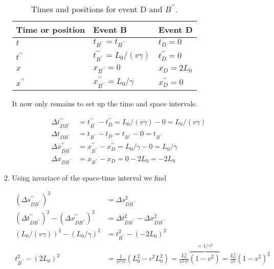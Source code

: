 \documentclass[a4paper,10pt,english]{article}
\begin{document}
\begin{enumerate}
\begin{enumerate}
\begin{table}[H]
  \begin{center}
    \begin{tabular}{| l | l | l |}
   	\hline
	 Time or position & Event B & Event D\\ \hline
	 $t$ & $t_{B^{\prime\prime}}=t_{B^{\prime\prime}}$ & $t_{D}=0$ \\ \hline
	 $t^{\prime\prime}$ & $t^{\prime\prime}_{B^{\prime\prime}}=L_{0}/(v\gamma)$ & $t_{D}^{\prime\prime}=0$\\ \hline
	 $x$ & $x_{B^{\prime\prime}}=0$ & $x_{D}=2L_{0}$\\ \hline
	 $x^{\prime\prime}$ & $x^{\prime\prime}_{B^{\prime\prime}}=L_{0}/\gamma$ & $x_{D}^{\prime\prime}=0$\\ \hline
	\end{tabular}
    \caption{Times and positions for event D and $B^{\prime\prime}$.}
    \label{tabel:ex_2A_8_2}
  \end{center}
\end{table}
\FloatBarrier

It now only remains to set up the time and space intervals.

\begin{align*}
\Delta t^{\prime\prime}_{DB^{\prime\prime}}&=t^{\prime\prime}_{B^{\prime\prime}}-t^{\prime\prime}_{D}=L_{0}/(v\gamma)-0=L_{0}/(v\gamma)\\
\Delta t_{DB^{\prime\prime}}&=t_{B^{\prime\prime}}-t_{D}=t_{B^{\prime\prime}}-0=t_{B^{\prime\prime}}\\
\Delta x^{\prime\prime}_{DB^{\prime\prime}}&=x^{\prime\prime}_{B^{\prime\prime}}-x^{\prime\prime}_{D}=L_{0}/\gamma-0=L_{0}/\gamma\\
\Delta x_{DB^{\prime\prime}}&=x_{B^{\prime\prime}}-x_{D}=0-2L_{0}=-2L_{0}
\end{align*}

\item Using invariace of the space-time interval we find

\begin{align*}
(\Delta s^{\prime\prime}_{DB^{\prime\prime}})^{2}&=\Delta s_{DB^{\prime\prime}}^{2}\\
(\Delta t^{\prime\prime}_{DB^{\prime\prime}})^{2}-(\Delta x^{\prime\prime}_{DB^{\prime\prime}})^{2}&=\Delta t_{DB^{\prime\prime}}^{2}-\Delta x_{DB^{\prime\prime}}^{2}\\
(L_{0}/(v\gamma))^{2}-(L_{0}/\gamma)^{2}&=t_{B^{\prime\prime}}^{2}-(-2L_{0})^{2}\\
t_{B^{\prime\prime}}^{2}-(2L_{0})^{2}&=\frac{1}{v^{2}\gamma^{2}}\left(L_{0}^{2}-v^{2}L_{0}^{2}\right)=\frac{L_{0}^{2}}{v^{2}\gamma^{2}}\overbrace{(1-v^{2})}^{=1/\gamma^{2}}=\frac{L_{0}^{2}}{v^{2}}(1-v^{2})^{2}
\end{align*}


\end{enumerate}
\end{enumerate}
\end{document}
